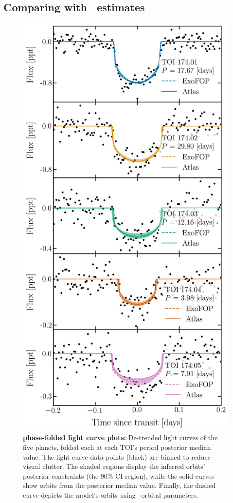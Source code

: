 \documentclass[floatfix,ApJL,twocolumn]{aastex631}
\begin{document}
\subsection{Comparing with \exofop\ estimates}

\begin{figure}\label{fig:phase}
    \centering
    \includegraphics[width=0.9\linewidth]{paper/figures/toi_174_phase.png}
    \caption{\textbf{ phase-folded light curve plots:}
    De-trended light curves of the five  planets, folded each at each TOI's period posterior median value.
    The light curve data points (black) are binned to reduce visual clutter.
    The shaded regions display the inferred orbits' posterior constraints (the 90\% CI region), while the solid curves show orbits from the posterior median value.
    Finally, the dashed curve depicts the model's orbits using \exofop\ orbital parameters.
    }
\end{figure}
\end{document}
